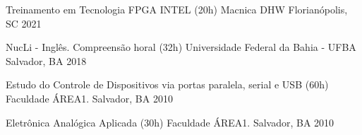 

\begin{cvhonors}

\cvhonor
  {Treinamento em Tecnologia FPGA INTEL (20h)} %
  {Macnica DHW} %
  {Florianópolis, SC} %
  {2021} %

  \cvhonor
    {NucLi - Inglês. Compreensão horal (32h)} %
    {Universidade Federal da Bahia - UFBA} %
    {Salvador, BA} %
    {2018} %
    

  \cvhonor
    {Estudo do Controle de Dispositivos via portas paralela, serial e USB (60h)} %
    {Faculdade ÁREA1.} %
    {Salvador, BA} %
    {2010} %

  \cvhonor
    {Eletrônica Analógica Aplicada (30h)} %
    {Faculdade ÁREA1.} %
    {Salvador, BA} %
    {2010} %

\end{cvhonors}
